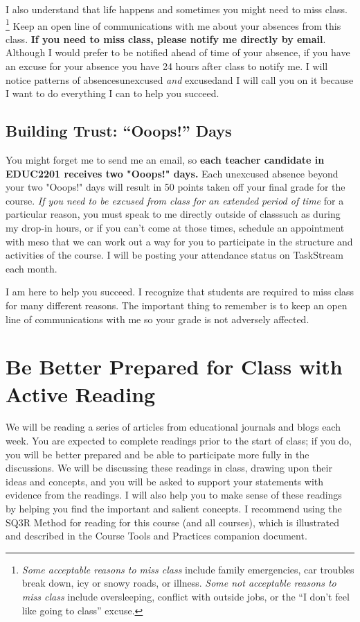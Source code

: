 \documentclass{tufte-handout}
\begin{document}
I also understand that life happens and sometimes you might need to miss class. \footnote{\textit{Some acceptable reasons to miss class} include family emergencies, car troubles break down, icy or snowy roads, or illness. \textit{Some not acceptable reasons to miss class} include oversleeping, conflict with outside jobs, or the \enquote{I don't feel like going to class} excuse.} Keep an open line of communications with me about your absences from this class. \textbf{If you need to miss class, please notify me directly by email}. Although I would prefer to be notified ahead of time of your absence, if you have an excuse for your absence you have 24 hours after class to notify me. I will notice patterns of absences\textemdash{}unexcused \emph{and} excused\textemdash{}and I will call you on it because I want to do everything I can to help you succeed.

\subsection{Building Trust: \enquote{Ooops!} Days}
You might forget me to send me an email, so \textbf{each teacher candidate in EDUC2201 receives two "Ooops!" days.} Each unexcused absence beyond your two "Ooops!" days will result in 50 points taken off your final grade for the course. \emph{If you need to be excused from class for an extended period of time} for a particular reason, you must speak to me directly outside of class\textemdash{}such as during my drop-in hours, or if you can't come at those times, schedule an appointment with me\textemdash{}so that we can work out a way for you to participate in the structure and activities of the course. I will be posting your attendance status on TaskStream each month.

 I am here to help you succeed. I recognize that students are required to miss class for many different reasons. The important thing to remember is to keep an open line of communications with me so your grade is not adversely affected.

\section{Be Better Prepared for Class with Active Reading}
We will be reading a series of articles from educational journals and blogs each week. You are expected to complete readings prior to the start of class; if you do, you will be better prepared and be able to participate more fully in the discussions. We will be discussing these readings in class, drawing upon their ideas and concepts, and you will be asked to support your statements with evidence from the readings. I will also help you to make sense of these readings by helping you find the important and salient concepts. I recommend using the \textsf{SQ3R Method} for reading for this course (and all courses), which is illustrated and described in the \textsf{Course Tools and Practices} companion document.
\end{document}
